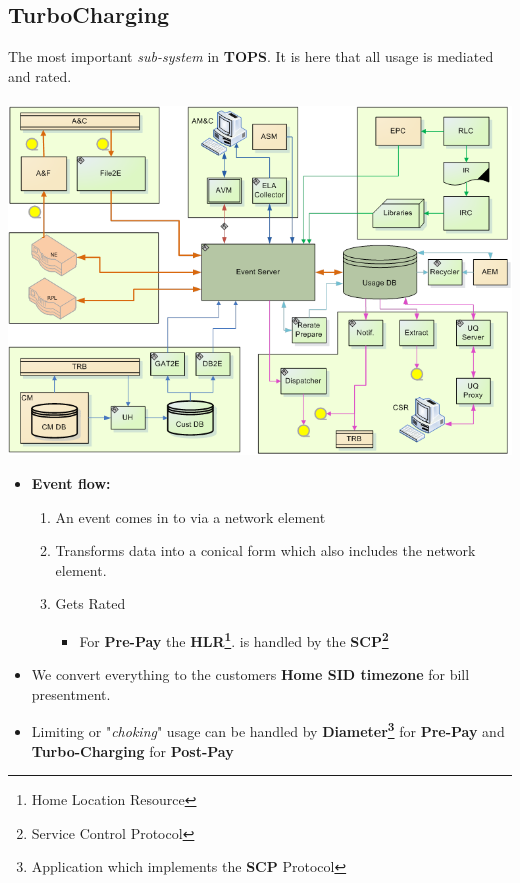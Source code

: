 \documentclass[12pt,twoside]{article}
\begin{document}
\subsection{TurboCharging}
\label{sec:orgheadline5}
The most important \emph{sub-system} in \textbf{TOPS}. It is here that all usage is mediated and rated.
\\
\\
\includegraphics[width=16cm]{Pictures/TC.png}

\newpage 
\begin{itemize}
\item \textbf{Event flow:}
\begin{enumerate}
\item An event comes in to via a network element
\item Transforms data into a conical form which also includes the
network element.
\item Gets Rated
\begin{itemize}
\item For \textbf{Pre-Pay} the \textbf{HLR\footnote{Home Location Resource}}. is handled by the \textbf{SCP\footnote{Service Control Protocol}}
\end{itemize}
\end{enumerate}
\item We convert everything to the customers \textbf{Home SID timezone} for bill
presentment.
\item Limiting or "\emph{choking}" usage can be handled by \textbf{Diameter\footnote{Application which implements the \textbf{SCP} Protocol}} for
\textbf{Pre-Pay} and \textbf{Turbo-Charging} for \textbf{Post-Pay}
\end{itemize}
\end{document}
